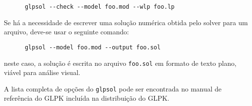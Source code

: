 \documentclass[11pt, brazil]{report}
\begin{document}
\begin{verbatim}
      glpsol --check --model foo.mod --wlp foo.lp
\end{verbatim}

\newpage

Se há a necessidade de escrever uma solução numérica obtida pelo solver
para um arquivo, deve-se usar o seguinte comando:

\begin{verbatim}
      glpsol --model foo.mod --output foo.sol
\end{verbatim}

\noindent neste caso, a solução é escrita no arquivo \verb|foo.sol|
em formato de texto plano, viável para análise visual.

A lista completa de opções do \verb|glpsol| pode ser encontrada no manual
de referência do GLPK incluída na distribuição do GLPK.
\end{document}
